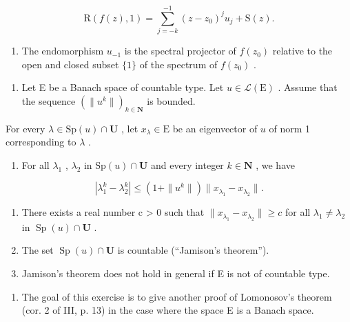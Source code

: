 \[
\mathrm{R} (f (z), 1) = \sum_ {j = - k} ^ {- 1} (z - z _ {0}) ^ {j} u _ {j} + \mathrm{S} (z).
\]

\begin{enumerate}
\def\labelenumi{\alph{enumi})}
\setcounter{enumi}{4}
\tightlist
\item
  The endomorphism \(u_{-1}\) is the spectral projector of \(f(z_0)\) relative to the open and closed subset \(\{1\}\) of the spectrum of \(f(z_0)\) .
\end{enumerate}

\begin{enumerate}
\def\labelenumi{\arabic{enumi})}
\setcounter{enumi}{3}
\tightlist
\item
  Let E be a Banach space of countable type. Let \(u \in \mathcal{L}(\mathrm{E})\) . Assume that the sequence \((\| u^k \|)_{k \in \mathbf{N}}\) is bounded.
\end{enumerate}

For every \(\lambda\in\mathrm{Sp}(u)\cap\mathbf{U}\) , let \(x_{\lambda}\in\mathrm{E}\) be an eigenvector of \(u\) of norm 1 corresponding to \(\lambda\) .

\begin{enumerate}
\def\labelenumi{\alph{enumi})}
\tightlist
\item
  For all \(\lambda_1\) , \(\lambda_2\) in \(\mathrm{Sp}(u) \cap \mathbf{U}\) and every integer \(k \in \mathbf{N}\) , we have
\end{enumerate}

\[
\left| \lambda_ {1} ^ {k} - \lambda_ {2} ^ {k} \right| \leqslant \left(1 + \| u ^ {k} \|\right) \| x _ {\lambda_ {1}} - x _ {\lambda_ {2}} \|.
\]

\begin{enumerate}
\def\labelenumi{\alph{enumi})}
\setcounter{enumi}{1}
\item
  There exists a real number c \textgreater{} 0 such that \(\|x_{\lambda_{1}} - x_{\lambda_{2}}\| \geqslant c\) for all \(\lambda_{1} \neq \lambda_{2}\) in \(\operatorname{Sp}(u) \cap \mathbf{U}\) .
\item
  The set \(\operatorname{Sp}(u) \cap \mathbf{U}\) is countable (“Jamison’s theorem”).
\item
  Jamison's theorem does not hold in general if E is not of countable type.
\end{enumerate}

\begin{enumerate}
\def\labelenumi{\arabic{enumi})}
\setcounter{enumi}{4}
\tightlist
\item
  The goal of this exercise is to give another proof of Lomonosov's theorem (cor. 2 of III, p. 13) in the case where the space E is a Banach space.
\end{enumerate}

